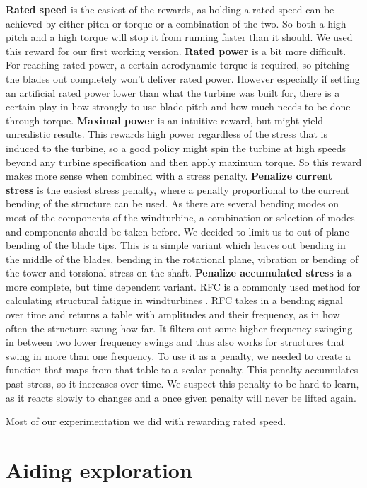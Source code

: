\documentclass[hyperref,german,beleg]{cgvpub}
\begin{document}
\textbf{Rated speed} is the easiest of the rewards, as holding a rated speed can be achieved by either pitch or torque or a combination of the two. So both a high pitch and a high torque will stop it from running faster than it should. We used this reward for our first working version.
\textbf{Rated power} is a bit more difficult. For reaching rated power, a certain aerodynamic torque is required, so pitching the blades out completely won't deliver rated power. However especially if setting an artificial rated power lower than what the turbine was built for, there is a certain play in how strongly to use blade pitch and how much needs to be done through torque.
\textbf{Maximal power} is an intuitive reward, but might yield unrealistic results. This rewards high power regardless of the stress that is induced to the turbine, so a good policy might spin the turbine at high speeds beyond any turbine specification and then apply maximum torque. So this reward makes more sense when combined with a stress penalty.
\textbf{Penalize current stress} is the easiest stress penalty, where a penalty proportional to the current bending of the structure can be used. As there are several bending modes on most of the components of the windturbine, a combination or selection of modes and components should be taken before. We decided to limit us to out-of-plane bending of the blade tips. This is a simple variant which leaves out bending in the middle of the blades, bending in the rotational plane, vibration or bending of the tower and torsional stress on the shaft.
\textbf{Penalize accumulated stress} is a more complete, but time dependent variant. \ac{RFC} is a commonly used method for calculating structural fatigue in windturbines \cite{berglindFatigueEstimationMethods2014}. \ac{RFC} takes in a bending signal over time and returns a table with amplitudes and their frequency, as in how often the structure swung how far. It filters out some higher-frequency swinging in between two lower frequency swings and thus also works for structures that swing in more than one frequency. To use it as a penalty, we needed to create a function that maps from that table to a scalar penalty. This penalty accumulates past stress, so it increases over time. We suspect this penalty to be hard to learn, as it reacts slowly to changes and a once given penalty will never be lifted again.

Most of our experimentation we did with rewarding rated speed.

\section{Aiding exploration}
\end{document}
